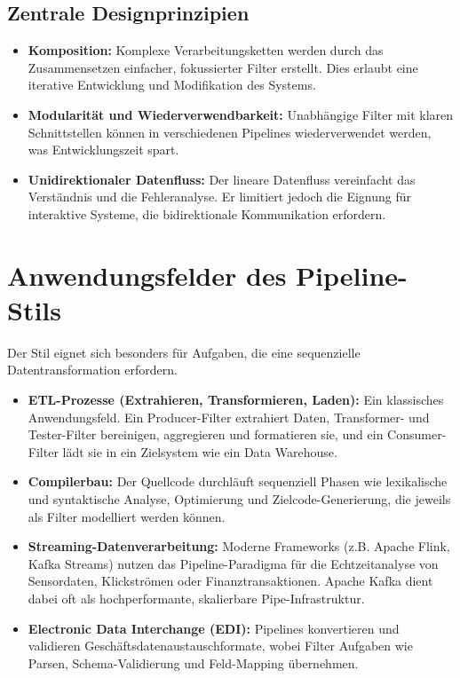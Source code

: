 \documentclass[10pt,a4paper]{article}
\begin{document}
\subsection{Zentrale Designprinzipien}
\begin{itemize}
\item \textbf{Komposition:} Komplexe Verarbeitungsketten werden durch das Zusammensetzen einfacher, fokussierter Filter erstellt. Dies erlaubt eine iterative Entwicklung und Modifikation des Systems.\cite{richards2020}
\item \textbf{Modularität und Wiederverwendbarkeit:} Unabhängige Filter mit klaren Schnittstellen können in verschiedenen Pipelines wiederverwendet werden, was Entwicklungszeit spart.
\item \textbf{Unidirektionaler Datenfluss:} Der lineare Datenfluss vereinfacht das Verständnis und die Fehleranalyse. Er limitiert jedoch die Eignung für interaktive Systeme, die bidirektionale Kommunikation erfordern.\cite{richards2020, uqcloud_pipeline}
\end{itemize}

\section{Anwendungsfelder des Pipeline-Stils}
Der Stil eignet sich besonders für Aufgaben, die eine sequenzielle Datentransformation erfordern.\cite{richards2020}
\begin{itemize}
\item \textbf{ETL-Prozesse (Extrahieren, Transformieren, Laden):} Ein klassisches Anwendungsfeld. Ein Producer-Filter extrahiert Daten, Transformer- und Tester-Filter bereinigen, aggregieren und formatieren sie, und ein Consumer-Filter lädt sie in ein Zielsystem wie ein Data Warehouse.\cite{projectpro_etl_usecases}
\item \textbf{Compilerbau:} Der Quellcode durchläuft sequenziell Phasen wie lexikalische und syntaktische Analyse, Optimierung und Zielcode-Generierung, die jeweils als Filter modelliert werden können.\cite{richards2020}
\item \textbf{Streaming-Datenverarbeitung:} Moderne Frameworks (z.B. Apache Flink, Kafka Streams) nutzen das Pipeline-Paradigma für die Echtzeitanalyse von Sensordaten, Klickströmen oder Finanztransaktionen. Apache Kafka dient dabei oft als hochperformante, skalierbare Pipe-Infrastruktur.\cite{acceldata_streaming}
\item \textbf{Electronic Data Interchange (EDI):} Pipelines konvertieren und validieren Geschäftsdatenaustauschformate, wobei Filter Aufgaben wie Parsen, Schema-Validierung und Feld-Mapping übernehmen.\cite{richards2020}
\end{itemize}
\end{document}
